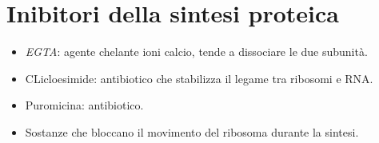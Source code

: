 \section{Inibitori della sintesi proteica}
\begin{multicols}{2}
	\begin{itemize}
		\item \emph{EGTA}: agente chelante ioni calcio, tende a dissociare le due subunit\`a.
		\item CLicloesimide: antibiotico che stabilizza il legame tra ribosomi e RNA.
		\item Puromicina: antibiotico.
		\item Sostanze che bloccano il movimento del ribosoma durante la sintesi.
	\end{itemize}
\end{multicols}
